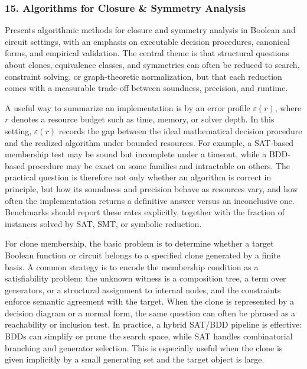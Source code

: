 \documentclass[11pt]{article}
\begin{document}

\subsubsection{15. Algorithms for Closure \& Symmetry Analysis}


Presents algorithmic methods for closure and symmetry analysis in Boolean and circuit settings, with an emphasis on executable decision procedures, canonical forms, and empirical validation. The central theme is that structural questions about clones, equivalence classes, and symmetries can often be reduced to search, constraint solving, or graph-theoretic normalization, but that each reduction comes with a measurable trade-off between soundness, precision, and runtime.

A useful way to summarize an implementation is by an error profile \(\varepsilon(r)\), where \(r\) denotes a resource budget such as time, memory, or solver depth. In this setting, \(\varepsilon(r)\) records the gap between the ideal mathematical decision procedure and the realized algorithm under bounded resources. For example, a SAT-based membership test may be sound but incomplete under a timeout, while a BDD-based procedure may be exact on some families and intractable on others. The practical question is therefore not only whether an algorithm is correct in principle, but how its soundness and precision behave as resources vary, and how often the implementation returns a definitive answer versus an inconclusive one. Benchmarks should report these rates explicitly, together with the fraction of instances solved by SAT, SMT, or symbolic reduction.

For clone membership, the basic problem is to determine whether a target Boolean function or circuit belongs to a specified clone generated by a finite basis. A common strategy is to encode the membership condition as a satisfiability problem: the unknown witness is a composition tree, a term over generators, or a structural assignment to internal nodes, and the constraints enforce semantic agreement with the target. When the clone is represented by a decision diagram or a normal form, the same question can often be phrased as a reachability or inclusion test. In practice, a hybrid SAT/BDD pipeline is effective: BDDs can simplify or prune the search space, while SAT handles combinatorial branching and generator selection. This is especially useful when the clone is given implicitly by a small generating set and the target object is large.
\end{document}
